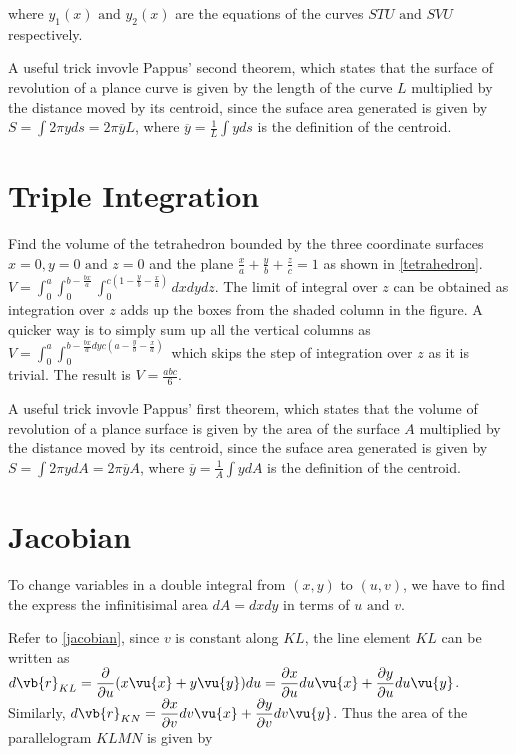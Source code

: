 \documentclass[english,a4paper,12pt]{report}
\begin{document}
where \(y_1 (x) \text { and } y_2 (x)\) are the equations of the curves \(STU \text { and } SVU\) respectively.   

A useful trick invovle Pappus' second theorem, which states that the surface of revolution of a plance curve is given by the length of the curve \(L\) multiplied by the distance moved by its centroid, since the suface area generated is given by \(\displaystyle S = \int 2\pi y ds = 2 \pi \overline{y} L\), where \(\displaystyle \overline{y} = \frac{1}{L} \int y ds \) is the definition of the centroid. 

\section{Triple Integration}
{Find the volume of the tetrahedron bounded by the three coordinate surfaces \(x=0, y=0 \text { and }  z=0\) and the plane \(\frac{x}{a} + \frac{y}{b} + \frac{z}{c} =1\) as shown in \cref{tetrahedron}.}
{\(\displaystyle V = \int_{0}^{a} \int_{0}^{b-\frac{bx}{a} } \int_{0}^{c(1-\frac{y}{b} - \frac{x}{a}  )} dxdydz\). The limit of integral over \(z\) can be obtained as integration over \(z\) adds up the boxes from the shaded column in the figure. A quicker way is to simply sum up all the vertical columns as \(\displaystyle V = \int_{0}^{a} \int_{0}^{b-\frac{bx}{a} dy c \left( a-\frac{y}{b} - \frac{x}{a}\right)}\) which skips the step of integration over \(z\) as it is trivial. The result is \(\displaystyle V = \frac{abc}{6} \). } 

A useful trick invovle Pappus' first theorem, which states that the volume of revolution of a plance surface is given by the area of the surface \(A\) multiplied by the distance moved by its centroid, since the suface area generated is given by \(\displaystyle S = \int 2\pi y dA = 2 \pi \overline{y} A\), where \(\displaystyle \overline{y} = \frac{1}{A} \int y dA \) is the definition of the centroid. 

\section{Jacobian}
To change variables in a double integral from \((x,y)\) to \((u,v)\), we have to find the express the infinitisimal area \(dA = dxdy\) in terms of \(u \text { and } v\). 

Refer to \cref{jacobian}, since \(v\) is constant along \(KL\), the line element \(KL\) can be written as \(\displaystyle d\vb{r} _{KL} = \frac{\partial }{\partial u} (x \vu{x} + y \vu{y} ) du = \frac{\partial x}{\partial u} du \vu{x} + \frac{\partial y}{\partial u} du \vu{y}\). Similarly, \(\displaystyle d\vb{r} _{KN}  = \frac{\partial x}{\partial v} dv \vu{x} + \frac{\partial y}{\partial v} dv \vu{y}\). Thus the area of the parallelogram \(KLMN\) is given by
\end{document}
